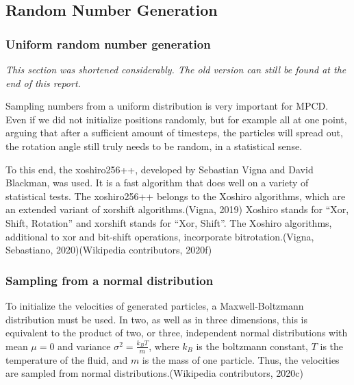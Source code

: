 \documentclass[
]{article}
\begin{document}
\hypertarget{random-number-generation}{%
\subsection{Random Number Generation}\label{random-number-generation}}

\hypertarget{uniform-random-number-generation}{%
\subsubsection{Uniform random number
generation}\label{uniform-random-number-generation}}

\emph{This section was shortened considerably. The old version can still
be found at the end of this report.}

Sampling numbers from a uniform distribution is very important for MPCD.
Even if we did not initialize positions randomly, but for example all at
one point, arguing that after a sufficient amount of timesteps, the
particles will spread out, the rotation angle still truly needs to be
random, in a statistical sense.

To this end, the xoshiro256++, developed by Sebastian Vigna and David
Blackman, was used. It is a fast algorithm that does well on a variety
of statistical tests. The xoshiro256++ belongs to the Xoshiro
algorithms, which are an extended variant of xorshift algorithms.(Vigna,
2019) Xoshiro stands for ``Xor, Shift, Rotation'' and xorshift stands
for ``Xor, Shift''. The Xoshiro algorithms, additional to xor and
bit-shift operations, incorporate bitrotation.(Vigna, Sebastiano,
2020)(Wikipedia contributors, 2020f)

\hypertarget{sampling-from-a-normal-distribution}{%
\subsubsection{Sampling from a normal
distribution}\label{sampling-from-a-normal-distribution}}

To initialize the velocities of generated particles, a Maxwell-Boltzmann
distribution must be used. In two, as well as in three dimensions, this
is equivalent to the product of two, or three, independent normal
distributions with mean \(\mu = 0\) and variance
\(\sigma^2 = \frac{k_{B}T}{m}\), where \(k_{B}\) is the boltzmann
constant, \(T\) is the temperature of the fluid, and \(m\) is the mass
of one particle. Thus, the velocities are sampled from normal
distributions.(Wikipedia contributors, 2020c)
\end{document}
